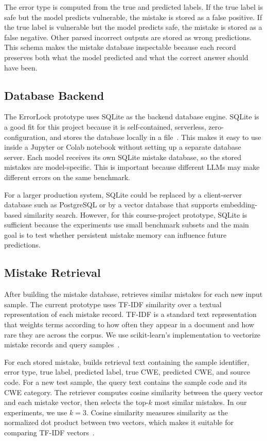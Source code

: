 The error type is computed from the true and predicted labels. If the true label is safe but the model predicts vulnerable, the mistake is stored as a false positive. If the true label is vulnerable but the model predicts safe, the mistake is stored as a false negative. Other parsed incorrect outputs are stored as wrong predictions. This schema makes the mistake database inspectable because each record preserves both what the model predicted and what the correct answer should have been.

\subsection{Database Backend}

The ErrorLock prototype uses SQLite as the backend database engine. SQLite is a good fit for this project because it is self-contained, serverless, zero-configuration, and stores the database locally in a file~\cite{sqlite}. This makes it easy to use inside a Jupyter or Colab notebook without setting up a separate database server. Each model receives its own SQLite mistake database, so the stored mistakes are model-specific. This is important because different LLMs may make different errors on the same benchmark.

For a larger production system, SQLite could be replaced by a client-server database such as PostgreSQL or by a vector database that supports embedding-based similarity search. However, for this course-project prototype, SQLite is sufficient because the experiments use small benchmark subsets and the main goal is to test whether persistent mistake memory can influence future predictions.

\subsection{Mistake Retrieval}

After building the mistake database, \system retrieves similar mistakes for each new input sample. The current prototype uses TF-IDF similarity over a textual representation of each mistake record. TF-IDF is a standard text representation that weights terms according to how often they appear in a document and how rare they are across the corpus. We use scikit-learn's implementation to vectorize mistake records and query samples~\cite{sklearn}.

For each stored mistake, \system builds retrieval text containing the sample identifier, error type, true label, predicted label, true CWE, predicted CWE, and source code. For a new test sample, the query text contains the sample code and its CWE category. The retriever computes cosine similarity between the query vector and each mistake vector, then selects the top-$k$ most similar mistakes. In our experiments, we use $k=3$. Cosine similarity measures similarity as the normalized dot product between two vectors, which makes it suitable for comparing TF-IDF vectors~\cite{sklearn}.

